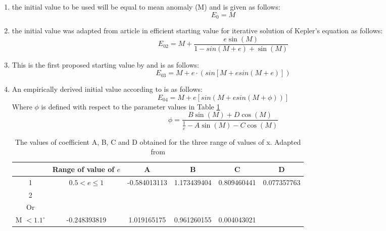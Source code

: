 \documentclass[a4paper,11pt]{article}
\begin{document}
\begin{enumerate}[label=\textbf{Test Case \arabic*}., leftmargin=*, labelsep=1em]
    \item the initial value to be used will be equal to mean anomaly (M) and is given as follows:
    \begin{equation*}
        E_0 = M
    \end{equation*} 
    \item the initial value was adapted from \textcite{smith1979} article in efficient starting value for iterative solution of Kepler's equation as follows:
        \begin{equation*}
            E_{02} = M + \dfrac{e \sin(M)}{1 - sin(M + e) + \sin(M)}
        \end{equation*}
    \item This is the first proposed starting value by \textcite{ozuomba2014comparative} and is as follows:
        \begin{equation*}
            E_{03} = M + e \cdot (sin[M + e{sin(M+e)}])
        \end{equation*}
    \item An empirically derived initial value according to \textcite{ozuomba2014comparative} is as follows:
    \begin{equation*}
        E_{04} = M + e [sin(M + e{sin( M + \phi)})]
    \end{equation*} 
    Where $\phi$ is defined with respect to the parameter values in Table \ref{tab:coefficients}
    \begin{equation*}
        \phi = \dfrac{B \sin(M) + D\cos(M)}{\frac{1}{e} - A\sin(M) - C\cos(M)}
    \end{equation*}
    \begin{table}[H]
        \centering
        \caption{The values of coefficient A, B, C and D obtained for the three range of values of x. Adapted from \textcite{ozuomba2014comparative}}
        \label{tab:coefficients}
        \vspace{2mm}
        \begin{tabularx}{\textwidth}{|c|c|c|c|c|c|}
            \hline
            & Range of value of $e$ & A & B & C & D \\ \hline
            1 & $0.5 < e \leq 1$ & -0.584013113 & 1.173439404 & 0.809460441 & 0.077357763 \\ \hline
            2 & \begin{tabular}[c]{@{}c@{}}$0.01 \leq e \leq 0.5$\\ Or\\ M $< 1.1^\circ$\end{tabular} & -0.248393819 & 1.019165175 & 0.961260155 & 0.004043021 \\ \hline
        \end{tabularx}
    \end{table}

\end{enumerate}
\end{document}
